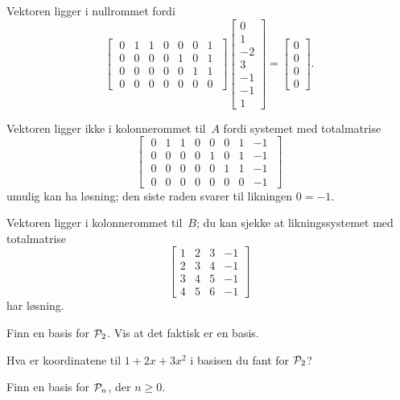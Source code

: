 \begin{losning}
\begin{punkt}
Vektoren ligger i nullrommet fordi 
$$\begin{bmatrix}
\;0 & 1 & 1 & 0 & 0 & 0 & 1\;\\
\;0 & 0 & 0 & 0 & 1 & 0 & 1\;\\
\;0 & 0 & 0 & 0 & 0 & 1 & 1\;\\
\;0 & 0 & 0 & 0 & 0 & 0 & 0\;
\end{bmatrix}
\begin{bmatrix}
0\\
1\\
-2\\
3\\
-1\\
-1\\
1
\end{bmatrix}=
\begin{bmatrix}
0\\
0\\
0\\
0
\end{bmatrix}.
 $$
\end{punkt}

\begin{punkt}
Vektoren ligger ikke i kolonnerommet til~$A$ fordi systemet med totalmatrise 
$$
\begin{bmatrix}
\;0 & 1 & 1 & 0 & 0 & 0 & 1 & -1 \;\\
\;0 & 0 & 0 & 0 & 1 & 0 & 1 & -1 \;\\
\;0 & 0 & 0 & 0 & 0 & 1 & 1 & -1 \;\\
\;0 & 0 & 0 & 0 & 0 & 0 & 0 & -1 \;
\end{bmatrix}
$$
umulig kan ha løsning; den siste raden svarer til likningen $0=-1$.

Vektoren ligger i kolonnerommet til~$B$; du kan sjekke at likningssystemet med totalmatrise 
$$
\begin{bmatrix}
	1 & 2 & 3 & -1\\
	2 & 3 & 4 & -1\\
	3 & 4 & 5 & -1\\
	4 & 5 & 6 & -1
	\end{bmatrix}
$$ har løsning.
\end{punkt}

\end{losning}


\begin{oppgave}

\begin{punkt}
Finn en basis for $\P_2$. Vis at det faktisk er en basis.
\end{punkt}

\begin{punkt}
Hva er koordinatene til $1+2x+3x^2$ i basisen du fant for $\P_2$?
\end{punkt}

\begin{punkt}
Finn en basis for $\P_n$, der $n \ge 0$.
\end{punkt}

\end{oppgave}

